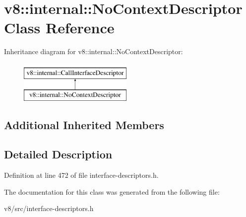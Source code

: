\hypertarget{classv8_1_1internal_1_1NoContextDescriptor}{}\section{v8\+:\+:internal\+:\+:No\+Context\+Descriptor Class Reference}
\label{classv8_1_1internal_1_1NoContextDescriptor}
Inheritance diagram for v8\+:\+:internal\+:\+:No\+Context\+Descriptor\+:\begin{figure}[H]
\begin{center}
\leavevmode
\includegraphics[height=2.000000cm]{classv8_1_1internal_1_1NoContextDescriptor}
\end{center}
\end{figure}
\subsection*{Additional Inherited Members}


\subsection{Detailed Description}


Definition at line 472 of file interface-\/descriptors.\+h.



The documentation for this class was generated from the following file\+:\begin{DoxyCompactItemize}
\item 
v8/src/interface-\/descriptors.\+h\end{DoxyCompactItemize}
